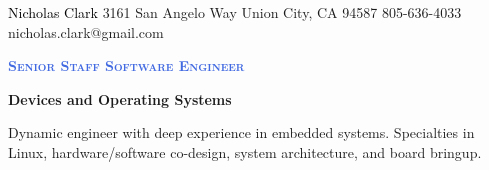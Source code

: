 \documentclass[letterpaper, 10pt]{article}
\newcommand{\NrcColorName}{Black}
\newcommand{\NrcColorTitle}{RoyalBlue}
\begin{document}
%
\nrctitle
{\textcolor{\NrcColorName}{Nicholas Clark}}
{3161 San Angelo Way}
{Union City, CA 94587}
{805-636-4033}
{nicholas.clark@gmail.com}
%
\begin{center}\par\smallskip
\textcolor{\NrcColorTitle}{\Large \textbf{\textsc{Senior Staff Software Engineer}}}\par
\large \textbf{{Devices and Operating Systems}}\par
\smallskip
\noindent \begin{minipage}[t]{0.75\textwidth}%
\begin{center}
Dynamic engineer with deep experience in embedded systems. Specialties in
Linux, hardware/software co-design, system architecture, and board bringup.
\end{center}
\end{minipage}
\end{center}
\par \smallskip \smallskip
%
%
\end{document}
